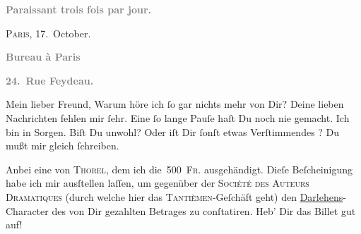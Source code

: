 \pstart
           \begin{otherlanguage}{french}\textcolor{gray}{\textbf{\textbf{Paraissant trois fois par jour.}}}\end{otherlanguage}\hfill \textsc{Paris}, 17. October.\pend
           
\pstart
           \begin{otherlanguage}{french}\textcolor{gray}{\textbf{\textbf{Bureau à Paris}}}\end{otherlanguage}\pend
           
\pstart
           \begin{otherlanguage}{french}\textcolor{gray}{\textbf{\textbf{24. Rue Feydeau.}}}\end{otherlanguage}\pend
           
\pstart\center{}Mein lieber Freund,\pend\vspace{0.5em}
\pstart
           Warum höre ich ſo gar nichts mehr von Dir? Deine lieben Nachrichten fehlen mir ſehr.
               Eine ſo lange Pauſe haſt Du noch nie gemacht. Ich bin in Sorgen. Biſt Du unwohl? Oder
               iſt Dir ſonſt etwas Verſtimmendes \label{K_L02787-1v}\label{K_L02787-1}? Du mußt mir gleich ſchreiben.\pend
           
\pstart
           Anbei eine \label{K_L02787-2v}\label{K_L02787-2} von \textsc{Thorel}, dem ich die 500 \textsc{Fr.} ausgehändigt. Dieſe
               Beſcheinigung habe ich mir ausſtellen laſſen, um gegenüber der \textsc{Société des Auteurs Dramatiques} (durch welche hier das \textsc{Tantièmen}-Geſchäft geht) {\pb}den \uline{Darlehens}-Character des von Dir gezahlten Betrages zu conſtatiren. Heb’ Dir das
               Billet gut auf!\pend
           

